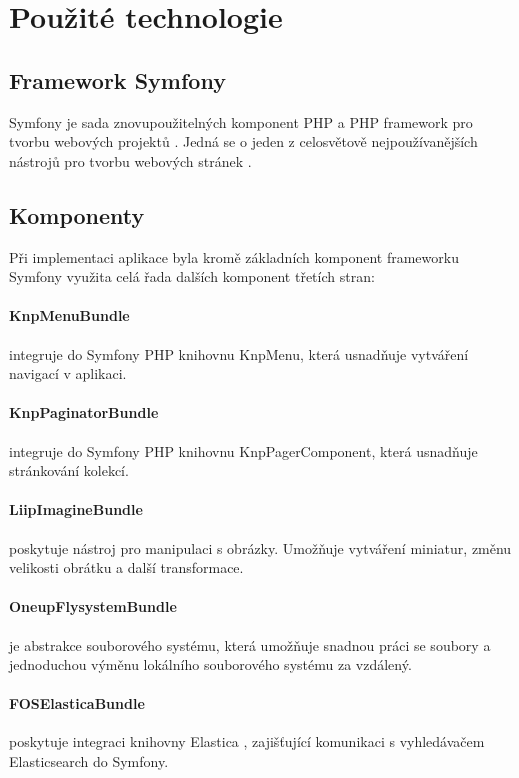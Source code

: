 \section{Použité technologie}\label{implementace-technologie}

\subsection{Framework Symfony}  
Symfony je sada znovupoužitelných komponent PHP a PHP framework pro tvorbu webových projektů \autocite{symfony}. Jedná se o jeden z celosvětově nejpoužívanějších nástrojů pro tvorbu webových stránek \autocite{php-frameworky}.

\subsection{Komponenty}
Při implementaci aplikace byla kromě základních komponent frameworku Symfony využita celá řada dalších komponent třetích stran:

    \paragraph{KnpMenuBundle}
    integruje do Symfony PHP knihovnu KnpMenu, která usnadňuje vytváření navigací v aplikaci. \autocite{knpmenu} 

    \paragraph{KnpPaginatorBundle}
    integruje do Symfony PHP knihovnu KnpPagerComponent, která usnadňuje stránkování kolekcí. \autocite{knppaginator}
    
    \paragraph{LiipImagineBundle}
    poskytuje nástroj pro manipulaci s obrázky. Umožňuje vytváření miniatur, změnu velikosti obrátku a další transformace. \autocite{liipimagine}

    \paragraph{OneupFlysystemBundle}
    je abstrakce souborového systému, která umožňuje snadnou práci se soubory a jednoduchou výměnu lokálního souborového systému za vzdálený. \autocite{oneupflysytem}
   
    \paragraph{FOSElasticaBundle}
    poskytuje integraci knihovny Elastica \autocite{elastica}, zajišťující komunikaci s vyhledávačem Elasticsearch \autocite{elasticsearch} do Symfony. \autocite{foselastica}  
   

